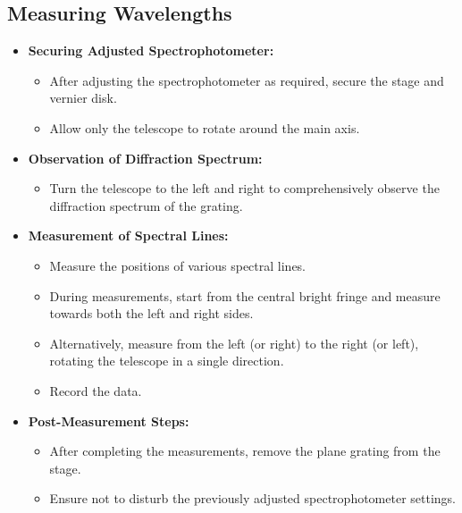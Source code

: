 \documentclass[UTF8]{article}
\begin{document}
    \subsection{Measuring Wavelengths}
    \begin{itemize}
      \item \textbf{Securing Adjusted Spectrophotometer:}
        \begin{itemize}
          \item After adjusting the spectrophotometer as required, secure the stage and vernier disk.
          \item Allow only the telescope to rotate around the main axis.
        \end{itemize}
    
      \item \textbf{Observation of Diffraction Spectrum:}
        \begin{itemize}
          \item Turn the telescope to the left and right to comprehensively observe the diffraction spectrum of the grating.
        \end{itemize}
    
      \item \textbf{Measurement of Spectral Lines:}
        \begin{itemize}
          \item Measure the positions of various spectral lines.
          \item During measurements, start from the central bright fringe and measure towards both the left and right sides.
          \item Alternatively, measure from the left (or right) to the right (or left), rotating the telescope in a single direction.
          \item Record the data.
        \end{itemize}
    
      \item \textbf{Post-Measurement Steps:}
        \begin{itemize}
          \item After completing the measurements, remove the plane grating from the stage.
          \item Ensure not to disturb the previously adjusted spectrophotometer settings.
        \end{itemize}
    \end{itemize}
    
\end{document}
